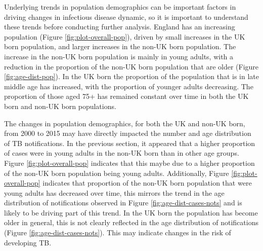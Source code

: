 \documentclass[11pt,twoside]{bristolthesis}
\begin{document}
  Underlying trends in population demographics can be important factors in driving changes in infectious disease dynamic, so it is important to understand these trends before conducting further analysis. England has an increasing population (Figure \ref{fig:plot-overall-pop}), driven by small increases in the UK born population, and larger increases in the non-UK born population. The increase in the non-UK born population is mainly in young adults, with a reduction in the proportion of the non-UK born population that are older (Figure \ref{fig:age-dist-pop}). In the UK born the proportion of the population that is in late middle age has increased, with the proportion of younger adults decreasing. The proportion of those aged 75+ has remained constant over time in both the UK born and non-UK born populations.
  
  The changes in population demographics, for both the UK and non-UK born, from 2000 to 2015 may have directly impacted the number and age distribution of TB notifications. In the previous section, it appeared that a higher proportion of cases were in young adults in the non-UK born than in other age groups. Figure \ref{fig:plot-overall-pop} indicates that this maybe due to a higher proportion of the non-UK born population being young adults. Additionally, Figure \ref{fig:plot-overall-pop} indicates that proportion of the non-UK born population that were young adults has decreased over time, this mirrors the trend in the age distribution of notifications observed in Figure \ref{fig:age-dist-cases-nots} and is likely to be driving part of this trend. In the UK born the population has become older in general, this is not clearly reflected in the age distribution of notifications (Figure \ref{fig:age-dist-cases-nots}). This may indicate changes in the risk of developing TB.
\end{document}
